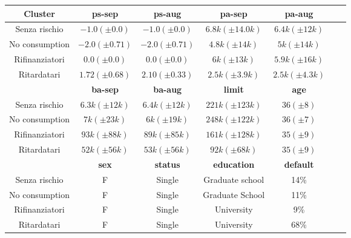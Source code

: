 \begin{center}
	
	\begin{tabular}{c|c|c|c|c|c|c}
		\hline
		\textbf{Cluster} & \textbf{ps-sep} 
		& \textbf{ps-aug} & \textbf{pa-sep} 
		& \textbf{pa-aug}\\
		\hline
		Senza rischio & 
		$-1.0 (\pm 0.0)$ & 
		$-1.0 (\pm 0.0)$ &
		$6.8k (\pm 14.0k)$ &
		$6.4k (\pm 12k)$\\
		\hline
		No consumption & 
		$-2.0 (\pm 0.71)$ & 
		$-2.0 (\pm 0.71)$ &
		$4.8k (\pm 14k)$ &
		$5k (\pm 14k)$\\
		\hline
		Rifinanziatori & 
		$0.0 (\pm 0.0)$ & 
		$0.0 (\pm 0.0)$ &
		$6k (\pm 13k)$ &
		$5.9k (\pm 16k)$\\
		\hline
		Ritardatari & 
		$1.72 (\pm 0.68)$ & 
		$2.10 (\pm 0.33)$ &
		$2.5k (\pm 3.9k)$ &
		$2.5k (\pm 4.3k)$\\
		\hline
		& 
		\textbf{ba-sep} & 
		\textbf{ba-aug} & 
		\textbf{limit} & 
		\textbf{age} &\\
		\hline
		Senza rischio & 
		$6.3k (\pm 12k)$ &
		$6.4k (\pm 12k)$ &
		$221k (\pm 123k)$ &
		$36 (\pm 8)$\\
		\hline
		No consumption &
		$7k (\pm 23k)$ &
		$6k (\pm 19k)$ &
		$248k (\pm 122k)$ &
		$36 (\pm 7)$\\
		\hline
		Rifinanziatori &
		$93k (\pm 88k)$ &
		$89k (\pm 85k)$ &
		$161k (\pm 128k)$ &
		$35 (\pm 9)$\\
		\hline
		Ritardatari &
		$52k (\pm 56k)$ &
		$53k (\pm 56k)$ &
		$92k (\pm 68k)$ &
		$35 (\pm 9)$\\
		\hline
		& 
		\textbf{sex} & 
		\textbf{status} & 
		\textbf{education} & 
		\textbf{default}\\
		\hline
		Senza rischio & 
		F &
		Single &
		Graduate school&
		14\%\\
		\hline
		No consumption & 
		F &
		Single &
		Graduate School &
		11\%\\
		\hline
		Rifinanziatori & 
		F &
		Single &
		University&
		9\%\\
		\hline
		Ritardatari & 
		F &
		Single &
		University&
		68\%\\
		\hline
	\end{tabular}
\end{center}